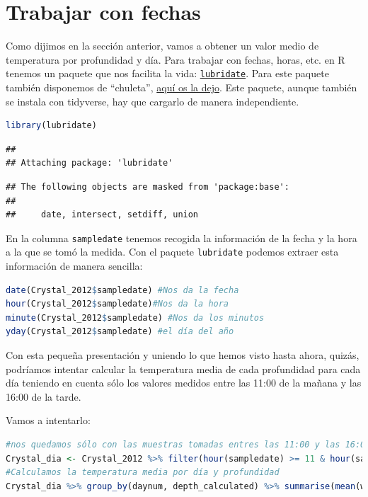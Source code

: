 \documentclass[
]{book}
\newcommand{\passthrough}[1]{#1}
\begin{document}
\hypertarget{trabajar-con-fechas}{%
\section{Trabajar con fechas}\label{trabajar-con-fechas}}

Como dijimos en la sección anterior, vamos a obtener un valor medio de temperatura por profundidad y día. Para trabajar con fechas, horas, etc. en R tenemos un paquete que nos facilita la vida: \href{https://cran.r-project.org/web/packages/lubridate/lubridate.pdf}{\passthrough{\lstinline!lubridate!}}. Para este paquete también disponemos de ``chuleta'', \href{https://raw.githubusercontent.com/rstudio/cheatsheets/master/lubridate.pdf}{aquí os la dejo}. Este paquete, aunque también se instala con tidyverse, hay que cargarlo de manera independiente.

\begin{lstlisting}[language=R]
library(lubridate)
\end{lstlisting}

\begin{lstlisting}
## 
## Attaching package: 'lubridate'
\end{lstlisting}

\begin{lstlisting}
## The following objects are masked from 'package:base':
## 
##     date, intersect, setdiff, union
\end{lstlisting}

En la columna \passthrough{\lstinline!sampledate!} tenemos recogida la información de la fecha y la hora a la que se tomó la medida. Con el paquete \passthrough{\lstinline!lubridate!} podemos extraer esta información de manera sencilla:

\begin{lstlisting}[language=R]
date(Crystal_2012$sampledate) #Nos da la fecha
hour(Crystal_2012$sampledate)#Nos da la hora
minute(Crystal_2012$sampledate) #Nos da los minutos
yday(Crystal_2012$sampledate) #el día del año
\end{lstlisting}

Con esta pequeña presentación y uniendo lo que hemos visto hasta ahora, quizás, podríamos intentar calcular la temperatura media de cada profundidad para cada día teniendo en cuenta sólo los valores medidos entre las 11:00 de la mañana y las 16:00 de la tarde.

Vamos a intentarlo:

\begin{lstlisting}[language=R]
#nos quedamos sólo con las muestras tomadas entres las 11:00 y las 16:00
Crystal_dia <- Crystal_2012 %>% filter(hour(sampledate) >= 11 & hour(sampledate) <= 16)
#Calculamos la temperatura media por día y profundidad
Crystal_dia %>% group_by(daynum, depth_calculated) %>% summarise(mean(water_temp))
\end{lstlisting}
\end{document}
